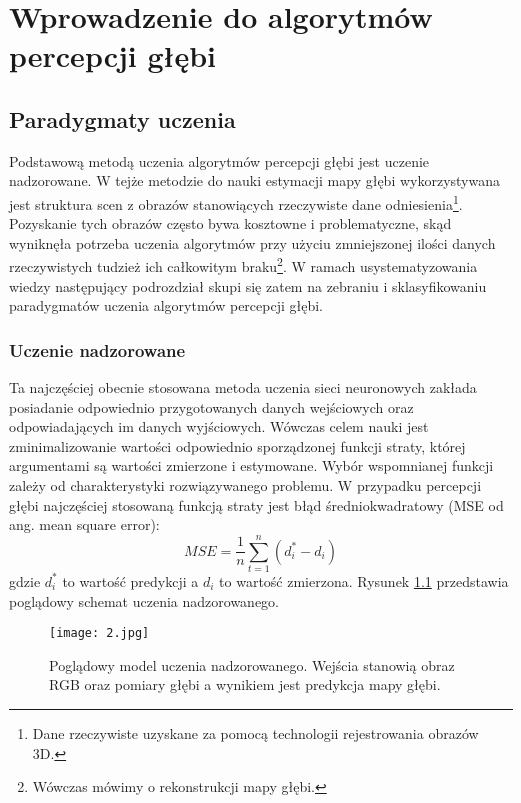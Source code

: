 \chapter{Wprowadzenie do algorytmów percepcji głębi}\label{chap:2_wprowadzenie_do_algorytmów_percepcji_głębi}

\section{Paradygmaty uczenia}
Podstawową metodą uczenia algorytmów percepcji głębi jest uczenie nadzorowane. W tejże metodzie do nauki estymacji mapy głębi wykorzystywana jest struktura scen z obrazów stanowiących rzeczywiste dane odniesienia\footnote{Dane rzeczywiste uzyskane za pomocą technologii rejestrowania obrazów 3D.}. Pozyskanie tych obrazów często bywa kosztowne i problematyczne, skąd wyniknęła potrzeba uczenia algorytmów przy użyciu zmniejszonej ilości danych rzeczywistych tudzież ich całkowitym braku\footnote{Wówczas mówimy o rekonstrukcji mapy głębi.}. W ramach usystematyzowania wiedzy następujący podrozdział skupi się zatem na zebraniu i sklasyfikowaniu paradygmatów uczenia algorytmów percepcji głębi.

\subsection{Uczenie nadzorowane}
Ta najczęściej obecnie stosowana metoda uczenia sieci neuronowych zakłada posiadanie odpowiednio przygotowanych danych wejściowych oraz odpowiadających im danych wyjściowych. Wówczas celem nauki jest zminimalizowanie wartości odpowiednio sporządzonej funkcji straty, której argumentami są wartości zmierzone i estymowane. Wybór wspomnianej funkcji zależy od charakterystyki rozwiązywanego problemu. W przypadku percepcji głębi najczęściej stosowaną funkcją straty jest błąd średniokwadratowy (MSE od ang. mean square error):
\begin{equation} \label{eq:1}
MSE = \frac{1}{n} \sum_{t=1}^{n} (d_i^* - d_i)
\end{equation}
gdzie \( d_i^* \) to wartość predykcji a \( d_i \) to wartość zmierzona.
Rysunek \ref{fig:uczenie-nadzorowane} przedstawia poglądowy schemat uczenia nadzorowanego.
\begin{figure}[H]
    \centering
    \texttt{[image: 2.jpg]}
    \caption{Poglądowy model uczenia nadzorowanego. Wejścia stanowią obraz RGB oraz pomiary głębi a wynikiem jest predykcja mapy głębi.}
    \label{fig:uczenie-nadzorowane}
\end{figure}

